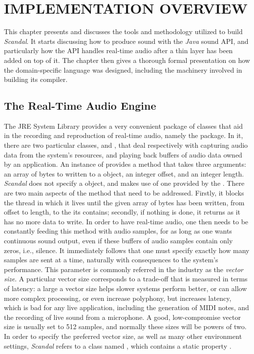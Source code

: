 \chapter{IMPLEMENTATION OVERVIEW}

This chapter presents and discusses the tools and methodology utilized to build \emph{Scandal}. It starts discussing how to produce sound with the \emph{Java} sound API, and particularly how the API handles real-time audio after a thin layer has been added on top of it. The chapter then gives a thorough formal presentation on how the domain-specific language was designed, including the machinery involved in building its compiler.

\section{The Real-Time Audio Engine}

The JRE System Library provides a very convenient package of classes that aid in the recording and reproduction of real-time audio, namely the  package. In it, there are two particular classes,  and , that deal respectively with capturing audio data from the system's resources, and playing back buffers of audio data owned by an application. An instance of  provides a  method that takes three arguments: an array of bytes to written to a  object, an integer offset, and an integer length. \emph{Scandal} does not specify a  object, and makes use of one provided by the . There are two main aspects of the  method that need to be addressed. Firstly, it blocks the thread in which it lives until the given array of bytes has been written, from offset to length, to the  its  contains; secondly, if nothing is done, it returns as it has no more data to write. In order to have real-time audio, one then needs to be constantly feeding this  method with audio samples, for as long as one wants continuous sound output, even if these buffers of audio samples contain only zeros, i.e., silence. It immediately follows that one must specify exactly how many samples are sent at a time, naturally with consequences to the system's performance. This parameter is commonly referred in the industry as the \emph{vector size}. A particular vector size corresponds to a trade-off that is measured in terms of latency: a large a vector size helps slower systems perform better, or can allow more complex processing, or even increase polyphony, but increases latency, which is bad for any live application, including the generation of MIDI notes, and the recording of live sound from a microphone. A good, low-compromise vector size is usually set to 512 samples, and normally these sizes will be powers of two. In order to specify the preferred vector size, as well as many other environment settings, \emph{Scandal} refers to a class named , which contains a static property .

